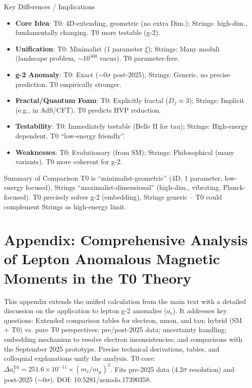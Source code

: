 \documentclass[12pt,a4paper]{article}
\begin{document}
	\begin{interpretation}{Key Differences / Implications}
		\begin{itemize}
			\item \textbf{Core Idea}: T0: 4D-extending, geometric (no extra Dim.); Strings: high-dim., fundamentally changing. T0 more testable (g-2).
			\item \textbf{Unification}: T0: Minimalist (1 parameter $\xi$); Strings: Many moduli (landscape problem, $\sim 10^{500}$ vacua). T0 parameter-free.
			\item \textbf{g-2 Anomaly}: T0: Exact ($\sim 0\sigma$ post-2025); Strings: Generic, no precise prediction. T0 empirically stronger.
			\item \textbf{Fractal/Quantum Foam}: T0: Explicitly fractal ($D_f \approx 3$); Strings: Implicit (e.g., in AdS/CFT). T0 predicts HVP reduction.
			\item \textbf{Testability}: T0: Immediately testable (Belle II for tau); Strings: High-energy dependent. T0 ``low-energy friendly''.
			\item \textbf{Weaknesses}: T0: Evolutionary (from SM); Strings: Philosophical (many variants). T0 more coherent for g-2.
		\end{itemize}
	\end{interpretation}
	
	\begin{result}{Summary of Comparison}
		T0 is ``minimalist-geometric'' (4D, 1 parameter, low-energy focused), Strings ``maximalist-dimensional'' (high-dim., vibrating, Planck-focused). T0 precisely solves g-2 (embedding), Strings generic -- T0 could complement Strings as high-energy limit.
	\end{result}
	
	
	\appendix
	\section{Appendix: Comprehensive Analysis of Lepton Anomalous Magnetic Moments in the T0 Theory}
	
	This appendix extends the unified calculation from the main text with a detailed discussion on the application to lepton g-2 anomalies ($a_\ell$). It addresses key questions: Extended comparison tables for electron, muon, and tau; hybrid (SM + T0) vs. pure T0 perspectives; pre/post-2025 data; uncertainty handling; embedding mechanism to resolve electron inconsistencies; and comparisons with the September 2025 prototype. Precise technical derivations, tables, and colloquial explanations unify the analysis. T0 core: $\Delta a_\ell^\text{T0} = 251.6 \times 10^{-11} \times (m_\ell / m_\mu)^2$. Fits pre-2025 data (4.2$\sigma$ resolution) and post-2025 ($\sim 0\sigma$). DOI: 10.5281/zenodo.17390358.
	
\end{document}
